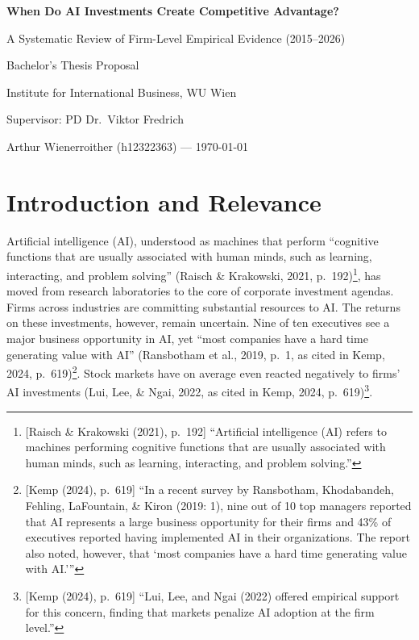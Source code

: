 \documentclass[12pt, a4paper]{article}
\begin{document}
\begin{center}
  {\LARGE\bfseries When Do AI Investments Create Competitive Advantage?\par}
  \vspace{0.3cm}
  {\large A Systematic Review of Firm-Level Empirical Evidence (2015--2026)\par}
  \vspace{0.6cm}
  {\normalsize Bachelor's Thesis Proposal\par}
  {\normalsize Institute for International Business, WU Wien\par}
  {\normalsize Supervisor: PD Dr.\ Viktor Fredrich\par}
  \vspace{0.3cm}
  {\normalsize Arthur Wienerroither (h12322363) --- \today\par}
\end{center}
\vspace{0.5cm}

\section{Introduction and Relevance}

Artificial intelligence (AI), understood as machines that perform ``cognitive
functions that are usually associated with human minds, such as learning,
interacting, and problem solving'' (Raisch \& Krakowski, 2021, p.~192)\footnote{[Raisch \& Krakowski (2021), p.~192] ``Artificial intelligence (AI) refers to machines performing cognitive functions that are usually associated with human minds, such as learning, interacting, and problem solving.''},
has moved from research laboratories to the core of corporate investment agendas.
Firms across industries are committing substantial resources to AI. The
returns on these investments, however, remain uncertain. Nine of ten executives see a major
business opportunity in AI, yet ``most companies have a hard time
generating value with AI'' (Ransbotham et al., 2019, p.~1, as cited in Kemp, 2024,
p.~619)\footnote{[Kemp (2024), p.~619] ``In a recent survey by Ransbotham, Khodabandeh, Fehling, LaFountain, \& Kiron (2019: 1), nine out of 10 top managers reported that AI represents a large business opportunity for their firms and 43\% of executives reported having implemented AI in their organizations. The report also noted, however, that `most companies have a hard time generating value with AI.'''}.
Stock markets have on average even reacted negatively to firms' AI investments
(Lui, Lee, \& Ngai, 2022, as cited in Kemp, 2024, p.~619)\footnote{[Kemp (2024), p.~619] ``Lui, Lee, and Ngai (2022) offered empirical support for this concern, finding that markets penalize AI adoption at the firm level.''}.
\end{document}
